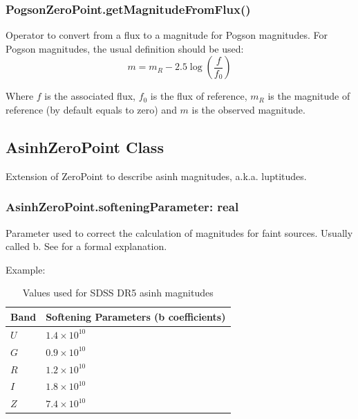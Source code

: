 \documentclass[11pt,a4paper]{ivoa}
\begin{document}
\subsubsection{PogsonZeroPoint.getMagnitudeFromFlux()}
Operator to convert from a flux to a magnitude for Pogson magnitudes. 
For Pogson magnitudes, the usual definition should be used:
\begin{equation} \label{eq:26}
m = m_R - 2.5\log(\frac{f}{f_0 })
\end{equation}

Where $f$ is the associated flux, $f_0$ is the flux of reference, 
$m_R$ is the magnitude of reference (by default equals to zero) and 
$m$ is the observed magnitude.
\par

\subsection{AsinhZeroPoint Class}
Extension of ZeroPoint  to describe asinh magnitudes, a.k.a. luptitudes.
\par

\subsubsection{AsinhZeroPoint.softeningParameter: real}
Parameter used to correct the calculation of magnitudes for faint 
sources. Usually called b. See \citep{1999AJ....118.1406L} for 
a formal explanation.
\par

Example:
\par


\begin{table}[ht]
\centering
    \begin{tabular}{|m{2.7cm}|m{8cm}|}
	\hline %
Band & Softening Parameters (b coefficients) \\
\hline
 $U$ & $1.4 \times 10^{10}$ \\
 $G$ & $0.9 \times 10^{10}$ \\
 $R$ & $1.2 \times 10^{10}$ \\
 $I$ & $1.8 \times 10^{10}$ \\
 $Z$ & $7.4 \times 10^{10}$ \\
\hline
\end{tabular}
\caption{Values used for SDSS DR5 asinh magnitudes}

\end{table}
\end{document}
